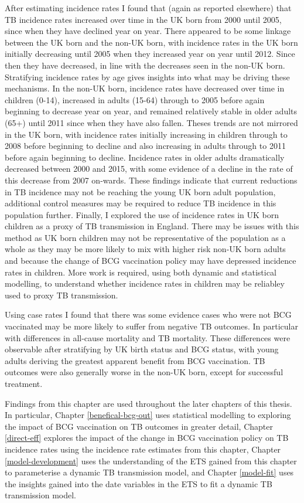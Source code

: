 \documentclass[11pt,twoside]{bristolthesis}
\begin{document}
  After estimating incidence rates I found that (again as reported elsewhere) that TB incidence rates increased over time in the UK born from 2000 until 2005, since when they have declined year on year. There appeared to be some linkage between the UK born and the non-UK born, with incidence rates in the UK born initially decreasing until 2005 when they increased year on year until 2012. Since then they have decreased, in line with the decreases seen in the non-UK born. Stratifying incidence rates by age gives insights into what may be driving these mechanisms. In the non-UK born, incidence rates have decreased over time in children (0-14), increased in adults (15-64) through to 2005 before again beginning to decrease year on year, and remained relatively stable in older adults (65+) until 2011 since when they have also fallen. Theses trends are not mirrored in the UK born, with incidence rates initially increasing in children through to 2008 before beginning to decline and also increasing in adults through to 2011 before again beginning to decline. Incidence rates in older adults dramatically decreased between 2000 and 2015, with some evidence of a decline in the rate of this decrease from 2007 on-wards. These findings indicate that current reductions in TB incidence may not be reaching the young UK born adult population, additional control measures may be required to reduce TB incidence in this population further. Finally, I explored the use of incidence rates in UK born children as a proxy of TB transmission in England. There may be issues with this method as UK born children may not be representative of the population as a whole as they may be more likely to mix with higher risk non-UK born adults and because the change of BCG vaccination policy may have depressed incidence rates in children. More work is required, using both dynamic and statistical modelling, to understand whether incidence rates in children may be reliabley used to proxy TB transmission.
  
  Using case rates I found that there was some evidence cases who were not BCG vaccinated may be more likely to suffer from negative TB outcomes. In particular with differences in all-cause mortality and TB mortality. These differences were observable after stratifying by UK birth status and BCG status, with young adults deriving the greatest apparent benefit from BCG vaccination. TB outcomes were also generally worse in the non-UK born, except for successful treatment.
  
  Findings from this chapter are used throughout the later chapters of this thesis. In particular, Chapter \ref{benefical-bcg-out} uses statistical modelling to exploring the impact of BCG vaccination on TB outcomes in greater detail, Chapter \ref{direct-eff} explores the impact of the change in BCG vaccination policy on TB incidence rates using the incidence rate estimates from this chapter, Chapter \ref{model-development} uses the understanding of the ETS gained from this chapter to parameterise a dynamic TB transmission model, and Chapter \ref{model-fit} uses the insights gained into the date variables in the ETS to fit a dynamic TB transmission model.
  
\end{document}
